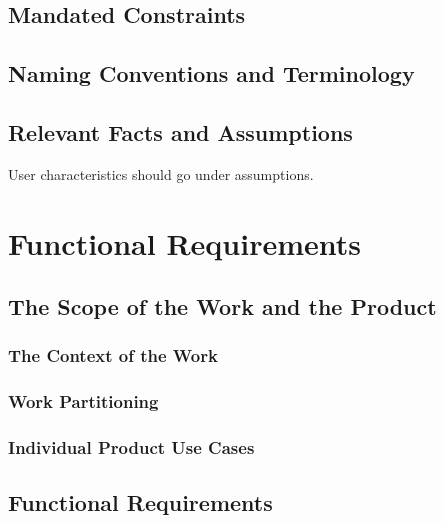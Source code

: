 \documentclass[12pt, titlepage]{article}
\begin{document}
\subsection{Mandated Constraints}

\subsection{Naming Conventions and Terminology}

\subsection{Relevant Facts and Assumptions}

User characteristics should go under assumptions.

\section{Functional Requirements}

\subsection{The Scope of the Work and the Product}

\subsubsection{The Context of the Work}

\subsubsection{Work Partitioning}

\subsubsection{Individual Product Use Cases}

\subsection{Functional Requirements}
\end{document}

